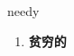 
\begin{frame}
{\huge needy}
\begin{center}
\begin{enumerate}\Large
  \item \textbf{贫穷的}
\end{enumerate}
\end{center}
\end{frame}
